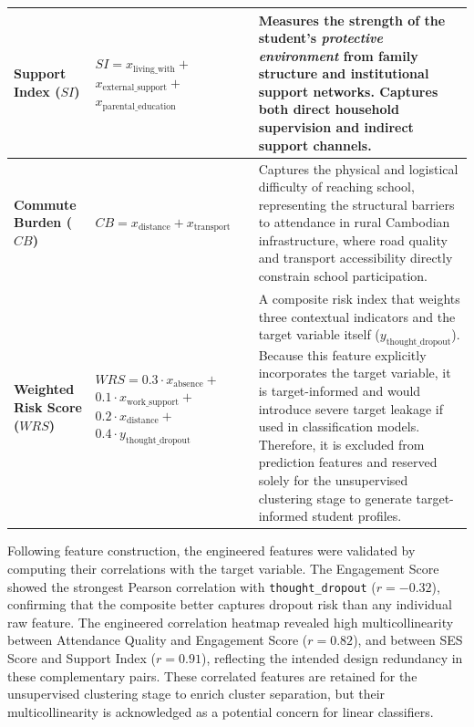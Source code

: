 \begin{longtable}{|p{2.8cm}|p{5.0cm}|p{7.8cm}|}
    \textbf{Support Index ($SI$)} &
    \parbox{4.8cm}{\vspace{0.1cm}\raggedright $SI = x_{\text{living\_with}} +$\\ $x_{\text{external\_support}} +$\\ $x_{\text{parental\_education}}$\vspace{0.1cm}} &
    Measures the strength of the student's \textit{protective environment} from family structure and institutional support networks. Captures both direct household supervision and indirect support channels. \\
    \hline

    \textbf{Commute Burden ($CB$)} &
    $CB = x_{\text{distance}} + x_{\text{transport}}$ &
    Captures the physical and logistical difficulty of reaching school, representing the structural barriers to attendance in rural Cambodian infrastructure, where road quality and transport accessibility directly constrain school participation. \\
    \hline

    \textbf{Weighted Risk Score ($WRS$)} &
    \parbox{4.8cm}{\vspace{0.1cm}\raggedright $WRS = 0.3 \cdot x_{\text{absence}} +$\\ $0.1 \cdot x_{\text{work\_support}} +$\\ $0.2 \cdot x_{\text{distance}} +$\\ $0.4 \cdot y_{\text{thought\_dropout}}$\vspace{0.1cm}} &
    A composite risk index that weights three contextual indicators and the target variable itself ($y_{\text{thought\_dropout}}$). Because this feature explicitly incorporates the target variable, it is target-informed and would introduce severe target leakage if used in classification models. Therefore, it is excluded from prediction features and reserved solely for the unsupervised clustering stage to generate target-informed student profiles. \\
    \hline

\end{longtable}

Following feature construction, the engineered features were validated by computing their correlations with the target variable. The Engagement Score showed the strongest Pearson correlation with \texttt{thought\_dropout} ($r = -0.32$), confirming that the composite better captures dropout risk than any individual raw feature. The engineered correlation heatmap revealed high multicollinearity between Attendance Quality and Engagement Score ($r = 0.82$), and between SES Score and Support Index ($r = 0.91$), reflecting the intended design redundancy in these complementary pairs. These correlated features are retained for the unsupervised clustering stage to enrich cluster separation, but their multicollinearity is acknowledged as a potential concern for linear classifiers.

